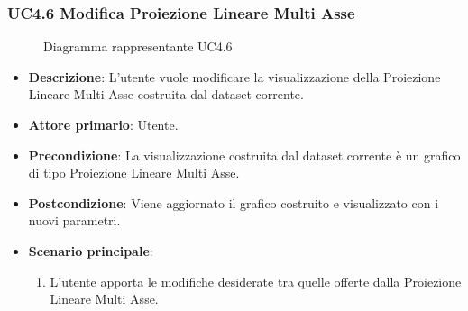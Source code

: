 \newpage
\subsubsection{UC4.6 Modifica Proiezione Lineare Multi Asse}
\label{ssub:uc4.6}
\begin{figure}[h]
    \centering
    \caption{Diagramma rappresentante UC4.6}
    \label{fig:UC4.6}
\end{figure}

\begin{itemize}
    \item \textbf{Descrizione}: L’utente vuole modificare la visualizzazione della Proiezione Lineare Multi Asse
                                costruita dal dataset corrente.
	
    \item \textbf{Attore primario}: Utente.
    
    \item \textbf{Precondizione}:   La visualizzazione costruita dal dataset corrente è un grafico di tipo Proiezione Lineare Multi Asse.
    \item \textbf{Postcondizione}:  Viene aggiornato il grafico costruito e visualizzato con i nuovi parametri.

	\item \textbf{Scenario principale}:
		\begin{enumerate}
            \item L'utente apporta le modifiche desiderate tra quelle offerte dalla Proiezione Lineare Multi Asse.
        \end{enumerate}
\end{itemize}

